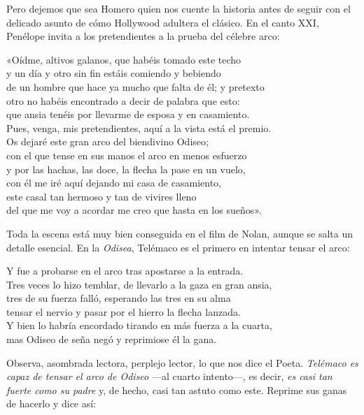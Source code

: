 Pero dejemos que sea Homero quien nos cuente la historia antes de seguir con el delicado asunto de cómo Hollywood adultera el clásico. En el canto XXI, Penélope invita a los pretendientes a la prueba del célebre arco:

\begin{versocita}
«Oídme, altivos galanos, que habéis tomado este techo\\
y un día y otro sin fin estáis comiendo y bebiendo\\
de un hombre que hace ya mucho que falta de él; y pretexto\\
otro no habéis encontrado a decir de palabra que esto:\\
que ansia tenéis por llevarme de esposa y en casamiento.\\
Pues, venga, mis pretendientes, aquí a la vista está el premio.\\
Os dejaré este gran arco del biendivino Odiseo;\\
con el que tense en sus manos el arco en menos esfuerzo\\
y por las hachas, las doce, la flecha la pase en un vuelo,\\
con él me iré aquí dejando mi casa de casamiento,\\
este casal tan hermoso y tan de vivires lleno\\
del que me voy a acordar me creo que hasta en los sueños».
\end{versocita}

Toda la escena está muy bien conseguida en el film de Nolan, aunque se salta un detalle esencial. En la \emph{Odisea}, Telémaco es el primero en intentar tensar el arco:

\begin{versocita}
Y fue a probarse en el arco tras apostarse a la entrada.\\
Tres veces lo hizo temblar, de llevarlo a la gaza en gran ansia,\\
tres de su fuerza falló, esperando las tres en su alma\\
tensar el nervio y pasar por el hierro la flecha lanzada.\\
Y bien lo habría encordado tirando en más fuerza a la cuarta,\\
mas Odiseo de seña negó y reprimiose él la gana.
\end{versocita}

Observa, asombrada lectora, perplejo lector, lo que nos dice el Poeta. \emph{Telémaco es capaz de tensar el arco de Odiseo} ---al cuarto intento---, es decir, \emph{es casi tan fuerte como su padre} y, de hecho, casi tan astuto como este. Reprime sus ganas de hacerlo y dice así:

